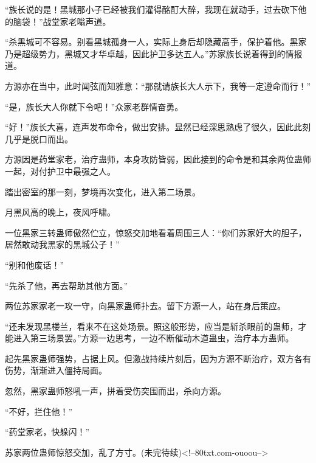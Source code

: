 \begin{this_body}
“族长说的是！黑城那小子已经被我们灌得酩酊大醉，我现在就动手，过去砍下他的脑袋！”战堂家老嗡声道。

“杀黑城可不容易。别看黑城孤身一人，实际上身后却隐藏高手，保护着他。黑家乃是超级势力，黑城又才华卓越，因此护卫多达五人。”苏家族长说着得到的情报道。

方源亦在当中，此时闻弦而知雅意：“那就请族长大人示下，我等一定遵命而行！”

“是，族长大人你就下令吧！”众家老群情奋勇。

“好！”族长大喜，连声发布命令，做出安排。显然已经深思熟虑了很久，因此此刻几乎是脱口而出。

方源因是药堂家老，治疗蛊师，本身攻防皆弱，因此接到的命令是和其余两位蛊师一起，对付护卫中最强之人。

踏出密室的那一刻，梦境再次变化，进入第二场景。

月黑风高的晚上，夜风呼啸。

一位黑家三转蛊师傲然伫立，惊怒交加地看着周围三人：“你们苏家好大的胆子，居然敢动我黑家的黑城公子！”

“别和他废话！”

“先杀了他，再去帮助其他方面。”

两位苏家家老一攻一守，向黑家蛊师扑去。留下方源一人，站在身后策应。

“还未发现黑楼兰，看来不在这处场景。照这般形势，应当是斩杀眼前的蛊师，才能进入第三场景罢。”方源一边思考，一边不断催动木道蛊虫，治疗本方蛊师。

起先黑家蛊师强势，占据上风。但激战持续片刻后，因为方源不断治疗，双方各有伤势，渐渐进入僵持局面。

忽然，黑家蛊师怒吼一声，拼着受伤突围而出，杀向方源。

“不好，拦住他！”

“药堂家老，快躲闪！”

苏家两位蛊师惊怒交加，乱了方寸。(未完待续)<!--80txt.com-ouoou-->

\end{this_body}

